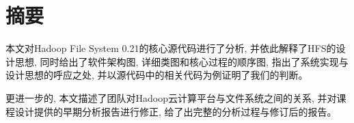 %
\chapter*{摘要}
\label{sec:abstract}
\vspace*{-10mm}

本文对Hadoop File System 0.21的核心源代码进行了分析,
并依此解释了HFS的设计思想, 同时给出了软件架构图, 详细类图和核心过程的顺序图,
指出了系统实现与设计思想的呼应之处,
并以源代码中的相关代码为例证明了我们的判断。

更进一步的, 本文描述了团队对Hadoop云计算平台与文件系统之间的关系,
并对课程设计提供的早期分析报告进行修正, 给了出完整的分析过程与修订后的报告。
\vspace*{20mm}
